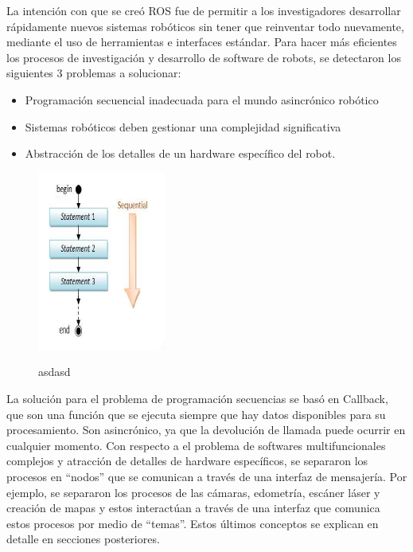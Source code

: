     La intención con que se creó ROS fue de permitir a los investigadores desarrollar rápidamente nuevos sistemas robóticos sin tener que reinventar todo nuevamente, mediante el uso de herramientas e interfaces estándar. Para hacer más eficientes los procesos de investigación y desarrollo de software de robots, se detectaron los siguientes 3 problemas a solucionar:
    
    \begin{itemize}
        \item {Programación secuencial inadecuada para el mundo asincrónico robótico}
        \item {Sistemas robóticos deben gestionar una complejidad significativa}
        \item {Abstracción de los detalles de un hardware específico del robot.}
    \end{itemize}

        \begin{figure}[htbp]
            \centering
            \includegraphics[width=0.4\linewidth]{Main/Chapter3/Images3/agrupar_problem_1.png}
            \label{f:Cap3-4_entidades_inicio_ros_1}
            \caption{asdasd}
        \end{figure}
        
    La solución para el problema de programación secuencias se basó en Callback, que son una función que se ejecuta siempre que hay datos disponibles para su procesamiento. Son asincrónico, ya que la devolución de llamada puede ocurrir en cualquier momento. Con respecto a el problema de softwares multifuncionales complejos y atracción de detalles de hardware específicos, se separaron los procesos en “nodos” que se comunican a través de una interfaz de mensajería. Por ejemplo, se separaron los procesos de las cámaras, edometría, escáner láser y creación de mapas y estos interactúan a través de una interfaz que comunica estos procesos por medio de “temas”. Estos últimos conceptos se explican en detalle en secciones posteriores.

